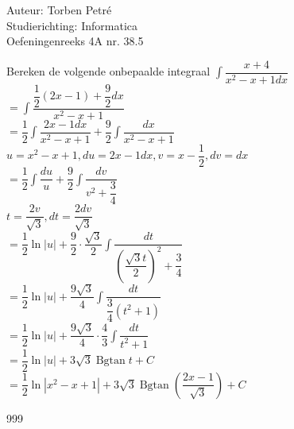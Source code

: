 \documentclass[a4paper]{article}
\newcommand{\Bgtan}{\operatorname{Bgtan}}
\begin{document}
  
\noindent \large Auteur: Torben Petré \\
\noindent \large Studierichting: Informatica\\
\noindent \large Oefeningenreeks 4A nr. 38.5\\

\medskip

\normalsize

Bereken de volgende onbepaalde integraal $\displaystyle\int \dfrac{x + 4}{x^2 - x +1 dx}$\\

$= \displaystyle\int \dfrac{\dfrac{1}{2}(2x - 1) + \dfrac{9}{2} dx}{x^2 - x +1}$\\

$= \dfrac{1}{2}\displaystyle\int \dfrac{2x -1 dx}{x^2 - x + 1} + \dfrac{9}{2}\displaystyle\int \dfrac{dx}{x^2 - x + 1}$\\

$u = x^2 - x + 1 , du = 2x - 1 dx, v = x - \dfrac{1}{2}, dv = dx$\\

$= \dfrac{1}{2}\displaystyle\int \dfrac{du}{u} + \dfrac{9}{2}\displaystyle\int \dfrac{dv}{v^2 + \dfrac{3}{4}}$\\

$t = \dfrac{2v}{\sqrt{3}},	dt = \dfrac{2dv}{\sqrt{3}}$\\

$= \dfrac{1}{2}\ln |u| + \dfrac{9}{2} \cdot \dfrac{\sqrt{3}}{2}\displaystyle\int \dfrac{dt}{\left(\dfrac{\sqrt{3}t}{2}\right)^2 + \dfrac{3}{4}}$\\

$= \dfrac{1}{2}\ln |u| + \dfrac{9\sqrt{3}}{4}\displaystyle\int \dfrac{dt}{\dfrac{3}{4}(t^2 + 1)}$ \\

$= \dfrac{1}{2}\ln |u| + \dfrac{9\sqrt{3}}{4} \cdot \dfrac{4}{3}\displaystyle\int \dfrac{dt}{t^2 + 1}$ \\

$= \dfrac{1}{2}\ln |u| + 3\sqrt{3} \Bgtan t + C$ \\

$= \dfrac{1}{2}\ln |x^2 - x +1| + 3\sqrt{3} \Bgtan \left(\dfrac{2x - 1}{\sqrt{3}}\right) + C$ \\

\begin{thebibliography}{999}
\end{thebibliography}
\end{document}
